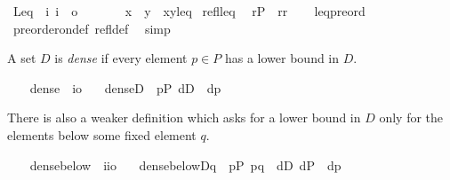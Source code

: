 \begin{isabellebody}
\isanewline
\isanewline
{}\isamarkupfalse%
\ Leq\ {\isacharcolon}{\kern0pt}{\isacharcolon}{\kern0pt}\ {\isachardoublequoteopen}{\isacharbrackleft}{\kern0pt}i{\isacharcomma}{\kern0pt}\ i{\isacharbrackright}{\kern0pt}\ {\isasymRightarrow}\ o{\isachardoublequoteclose}\ \ {\isacharparenleft}{\kern0pt}\ {\isachardoublequoteopen}{\isasympreceq}{\isachardoublequoteclose}\ {}{}{\isacharparenright}{\kern0pt}\isanewline
\ \ \ {\isachardoublequoteopen}x\ {\isasympreceq}\ y\ {\isasymequiv}\ {\isasymlangle}x{\isacharcomma}{\kern0pt}y{\isasymrangle}{\isasymin}leq{\isachardoublequoteclose}\isanewline
\isanewline
{}\isamarkupfalse%
\ refl{\isacharunderscore}{\kern0pt}leq{\isacharcolon}{\kern0pt}\isanewline
\ \ {\isachardoublequoteopen}r{\isasymin}P\ {\isasymLongrightarrow}\ r{\isasympreceq}r{\isachardoublequoteclose}\isanewline
%
\isadelimproof
\ \ %
\endisadelimproof
%
\isatagproof
{}\isamarkupfalse%
\ leq{\isacharunderscore}{\kern0pt}preord\ \isamarkupfalse%
\ preorder{\isacharunderscore}{\kern0pt}on{\isacharunderscore}{\kern0pt}def\ refl{\isacharunderscore}{\kern0pt}def\ \isamarkupfalse%
\ simp%
\endisatagproof
{\isafoldproof}%
%
\isadelimproof
%
\endisadelimproof
%
\begin{isamarkuptext}%
A set $D$ is \emph{dense} if every element $p\in P$ has a lower 
bound in $D$.%
\end{isamarkuptext}\isamarkuptrue%
\isamarkupfalse%
\ \isanewline
\ \ dense\ {\isacharcolon}{\kern0pt}{\isacharcolon}{\kern0pt}\ {\isachardoublequoteopen}i{\isasymRightarrow}o{\isachardoublequoteclose}\ \isanewline
\ \ {\isachardoublequoteopen}dense{\isacharparenleft}{\kern0pt}D{\isacharparenright}{\kern0pt}\ {\isasymequiv}\ {\isasymforall}p{\isasymin}P{\isachardot}{\kern0pt}\ {\isasymexists}d{\isasymin}D\ {\isachardot}{\kern0pt}\ d{\isasympreceq}p{\isachardoublequoteclose}%
\begin{isamarkuptext}%
There is also a weaker definition which asks for 
a lower bound in $D$ only for the elements below some fixed 
element $q$.%
\end{isamarkuptext}\isamarkuptrue%
\isamarkupfalse%
\ \isanewline
\ \ dense{\isacharunderscore}{\kern0pt}below\ {\isacharcolon}{\kern0pt}{\isacharcolon}{\kern0pt}\ {\isachardoublequoteopen}i{\isasymRightarrow}i{\isasymRightarrow}o{\isachardoublequoteclose}\ \isanewline
\ \ {\isachardoublequoteopen}dense{\isacharunderscore}{\kern0pt}below{\isacharparenleft}{\kern0pt}D{\isacharcomma}{\kern0pt}q{\isacharparenright}{\kern0pt}\ {\isasymequiv}\ {\isasymforall}p{\isasymin}P{\isachardot}{\kern0pt}\ p{\isasympreceq}q\ {\isasymlongrightarrow}\ {\isacharparenleft}{\kern0pt}{\isasymexists}d{\isasymin}D{\isachardot}{\kern0pt}\ d{\isasymin}P\ {\isasymand}\ d{\isasympreceq}p{\isacharparenright}{\kern0pt}{\isachardoublequoteclose}\isanewline

\end{isabellebody}
